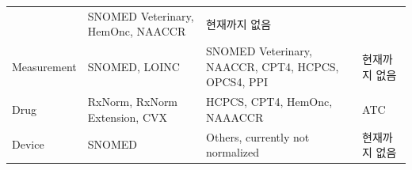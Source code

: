 \documentclass[11pt]{book}
\theoremstyle{definition}
\theoremstyle{definition}
\theoremstyle{definition}
\theoremstyle{remark}
\begin{document}
\begin{longtable}[]{@{}llll@{}}
\begin{minipage}[t]{0.21\columnwidth}
\end{minipage} & \begin{minipage}[t]{0.21\columnwidth}\raggedright\strut
SNOMED Veterinary, HemOnc, NAACCR\strut
\end{minipage} & \begin{minipage}[t]{0.18\columnwidth}\raggedright\strut
현재까지 없음\strut
\end{minipage}\tabularnewline
\begin{minipage}[t]{0.12\columnwidth}\raggedright\strut
Measurement\strut
\end{minipage} & \begin{minipage}[t]{0.21\columnwidth}\raggedright\strut
SNOMED, LOINC\strut
\end{minipage} & \begin{minipage}[t]{0.21\columnwidth}\raggedright\strut
SNOMED Veterinary, NAACCR, CPT4, HCPCS, OPCS4, PPI\strut
\end{minipage} & \begin{minipage}[t]{0.18\columnwidth}\raggedright\strut
현재까지 없음\strut
\end{minipage}\tabularnewline
\begin{minipage}[t]{0.12\columnwidth}\raggedright\strut
Drug\strut
\end{minipage} & \begin{minipage}[t]{0.21\columnwidth}\raggedright\strut
RxNorm, RxNorm Extension, CVX\strut
\end{minipage} & \begin{minipage}[t]{0.21\columnwidth}\raggedright\strut
HCPCS, CPT4, HemOnc, NAAACCR\strut
\end{minipage} & \begin{minipage}[t]{0.18\columnwidth}\raggedright\strut
ATC\strut
\end{minipage}\tabularnewline
\begin{minipage}[t]{0.12\columnwidth}\raggedright\strut
Device\strut
\end{minipage} & \begin{minipage}[t]{0.21\columnwidth}\raggedright\strut
SNOMED\strut
\end{minipage} & \begin{minipage}[t]{0.21\columnwidth}\raggedright\strut
Others, currently not normalized\strut
\end{minipage} & \begin{minipage}[t]{0.18\columnwidth}\raggedright\strut
현재까지 없음\strut
\end{minipage}\tabularnewline

\end{longtable}
\end{document}
